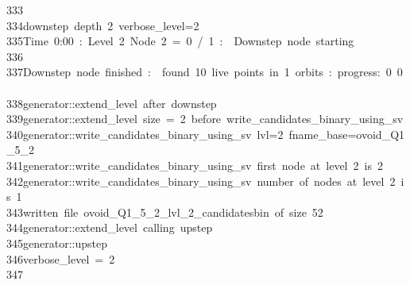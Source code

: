 \begin{tabbing}
333\>\\[0pt]
334\>downstep\ depth\ 2\ verbose\_level=2\\[0pt]
335\>Time\ 0:00\ :\ Level\ 2\ Node\ 2\ =\ 0\ /\ 1\ :\ \ Downstep\ node\ starting\\[0pt]
336\>\\[0pt]
337\>Downstep\ node\ finished\ :\ \ found\ 10\ live\ points\ in\ 1\ orbits\ :\ progress:\ 0\ 0\ \ \\[0pt]
338\>generator::extend\_level\ after\ downstep\\[0pt]
339\>generator::extend\_level\ size\ =\ 2\ before\ write\_candidates\_binary\_using\_sv\\[0pt]
340\>generator::write\_candidates\_binary\_using\_sv\ lvl=2\ fname\_base=ovoid\_Q1\_5\_2\\[0pt]
341\>generator::write\_candidates\_binary\_using\_sv\ first\ node\ at\ level\ 2\ is\ 2\\[0pt]
342\>generator::write\_candidates\_binary\_using\_sv\ number\ of\ nodes\ at\ level\ 2\ is\ 1\\[0pt]
343\>written\ file\ ovoid\_Q1\_5\_2\_lvl\_2\_candidatesbin\ of\ size\ 52\\[0pt]
344\>generator::extend\_level\ calling\ upstep\\[0pt]
345\>generator::upstep\\[0pt]
346\>verbose\_level\ =\ 2\\[0pt]
347\>\\[0pt]

\end{tabbing}

